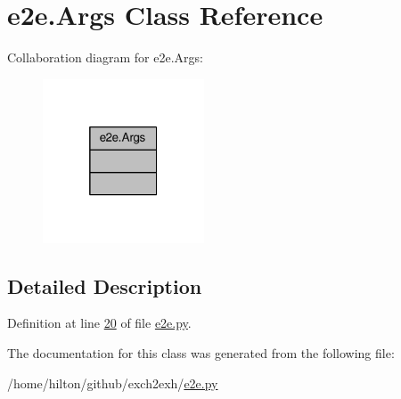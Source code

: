\hypertarget{classe2e_1_1_args}{}\section{e2e.\+Args Class Reference}
\label{classe2e_1_1_args}


Collaboration diagram for e2e.\+Args\+:\nopagebreak
\begin{figure}[H]
\begin{center}
\leavevmode
\includegraphics[width=136pt]{classe2e_1_1_args__coll__graph}
\end{center}
\end{figure}


\subsection{Detailed Description}


Definition at line \hyperlink{e2e_8py_source_l00020}{20} of file \hyperlink{e2e_8py_source}{e2e.\+py}.



The documentation for this class was generated from the following file\+:\begin{DoxyCompactItemize}
\item 
/home/hilton/github/exch2exh/\hyperlink{e2e_8py}{e2e.\+py}\end{DoxyCompactItemize}
